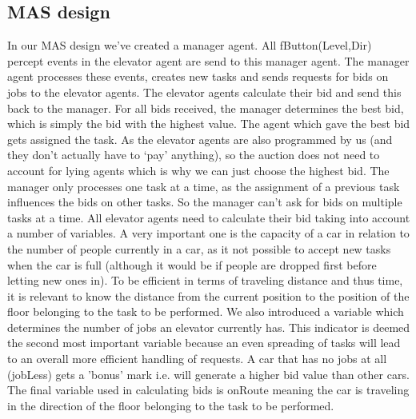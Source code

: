 \documentclass[a4paper,11pt]{article}
\begin{document}
\subsection{MAS design}
In our MAS design we've created a manager agent. All fButton(Level,Dir) percept events in the elevator agent are send to this manager agent. The manager agent processes these events, creates new tasks and sends requests for bids on jobs to the elevator agents. The elevator agents calculate their bid and send this back to the manager. For all bids received, the manager determines the best bid, which is simply the bid with the highest value. The agent which gave the best bid gets assigned the task. As the elevator agents are also programmed by us (and they don't actually have to `pay' anything), so the auction does not need to account for lying agents which is why we can just choose the highest bid. The manager only processes one task at a time, as the assignment of a previous task influences the bids on other tasks. So the manager can't ask for bids on multiple tasks at a time. 
\newline\newline
All elevator agents need to calculate their bid taking into account a number of variables. A very important one is the capacity of a car in relation to the number of people currently in a car, as it not possible to accept new tasks when the car is full (although it would be if people are dropped first before letting new ones in). To be efficient in terms of traveling distance and thus time, it is relevant to know the distance from the current position to the position of the floor belonging to the task to be performed. We also introduced a variable which determines the number of jobs an elevator currently has. This indicator is deemed the second most important variable because an even spreading of tasks will lead to an overall more efficient handling of requests. A car that has no jobs at all (jobLess) gets a 'bonus' mark i.e. will generate a higher bid value than other cars. The final variable used in calculating bids is onRoute meaning the car is traveling in the direction of the floor belonging to the task to be performed. 
\end{document}
